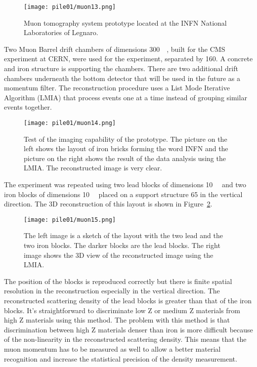 \documentclass[twoside,titlepage,11pt,twocolumn,a4paper]{article}
\begin{document}
\begin{figure}
  \texttt{[image: pile01/muon13.png]}
  \caption{Muon tomography system prototype located at the INFN
    National Laboratories of Legnaro. \citep{pesente2009}}
  \label{fig:muon13}
\end{figure}

Two Muon Barrel drift chambers of dimensions
\unit{300}{\cubic{\centi\metre}}, built for the CMS
experiment at CERN, were used for the experiment, separated by
\unit{160}{\centi\metre}. A concrete and iron structure is supporting
the chambers. There are two additional drift chambers underneath the
bottom detector that will be used in the future as a momentum
filter. The reconstruction procedure uses a List Mode Iterative
Algorithm (LMIA) that process events one at a time instead of grouping
similar events together. \citep{pesente2009}

\begin{figure}
  \texttt{[image: pile01/muon14.png]}
  \caption{Test of the imaging capability of the prototype. The
    picture on the left shows the layout of iron bricks forming the
    word INFN and the picture on the right shows the result of the
    data analysis using the LMIA. The reconstructed image is very
    clear. \citep{pesente2009}}
\end{figure}

The experiment was repeated using two lead blocks of dimensions
\unit{10}{\cubic{\centi\metre}} and two iron blocks of
dimensions \unit{10}{\cubic{\centi\metre}} placed on a
support structure \unit{65}{\centi\metre} in the vertical
direction. The 3D reconstruction of this layout is shown in
Figure~\ref{fig:muon15}.

\begin{figure}
  \texttt{[image: pile01/muon15.png]}
  \caption{The left image is a sketch of the layout with the two lead
    and the two iron blocks. The darker blocks are the lead
    blocks. The right image shows the 3D view of the reconstructed
    image using the LMIA. \citep{pesente2009}}
  \label{fig:muon15}
\end{figure}

The position of the blocks is reproduced correctly but there is finite
spatial resolution in the reconstruction especially in the vertical
direction. The reconstructed scattering density of the lead blocks is
greater than that of the iron blocks. It’s straightforward to
discriminate low Z or medium Z materials from high Z materials using
this method. The problem with this method is that discrimination
between high Z materials denser than iron is more difficult because of
the non-linearity in the reconstructed scattering density. This means
that the muon momentum has to be measured as well to allow a better
material recognition and increase the statistical precision of the
density measurement. \citep{pesente2009}
\end{document}
